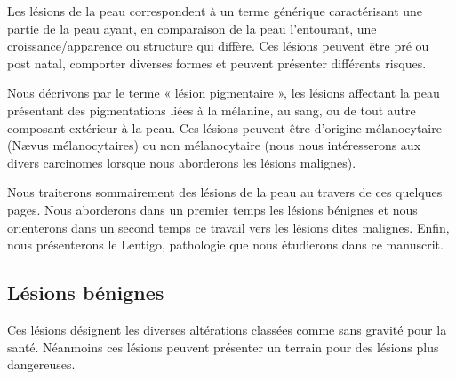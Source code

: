 Les lésions de la peau correspondent à un terme générique caractérisant une partie de la peau ayant, en comparaison de la peau l’entourant, une croissance/apparence ou structure qui diffère. Ces lésions peuvent être pré ou post natal, comporter diverses formes et peuvent présenter différents risques.\par

Nous décrivons par le terme « lésion pigmentaire », les lésions affectant la peau présentant des pigmentations liées à la mélanine, au sang, ou de tout autre composant extérieur à la peau. Ces lésions peuvent être d’origine mélanocytaire (Nævus mélanocytaires) ou non mélanocytaire (nous nous intéresserons aux divers carcinomes lorsque nous aborderons les lésions malignes).\par

Nous traiterons sommairement des lésions de la peau au travers de ces quelques pages. Nous aborderons dans un premier temps les lésions bénignes et nous orienterons dans un second temps ce travail vers les lésions dites malignes. Enfin, nous présenterons le Lentigo, pathologie que nous étudierons dans ce manuscrit.\par

\subsection{Lésions bénignes}
Ces lésions désignent les diverses altérations classées comme sans gravité pour la santé. Néanmoins ces lésions peuvent présenter un terrain pour des lésions plus dangereuses.\par

